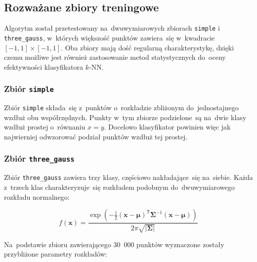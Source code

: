 \documentclass[11pt,a4paper]{article}
\begin{document}
\subsection{Rozważane zbiory treningowe}

Algorytm został przetestowany na~dwuwymiarowych zbiorach {\tt simple} i {\tt three\_gauss}, w~których większość punktów zawiera~się w~kwadracie $[-1,1] \times [-1,1]$.
Oba zbiory mają dość regularną charakterystykę, dzięki czemu możliwe jest również zastosowanie metod statystycznych do~oceny efektywności klasyfikatora $k$-NN.

\subsubsection{Zbiór {\tt simple}}

Zbiór {\tt simple} składa~się z~punktów o~rozkładzie zbliżonym do~jednostajnego wzdłuż obu współrzędnych. %
Punkty w~tym zbiorze podzielone~są na~dwie klasy wzdłuż prostej o~równaniu $x=y$.
Docelowo klasyfikator powinien więc jak najwierniej odwzorować podział punktów wzdłuż tej prostej.

\subsubsection{Zbiór {\tt three\_gauss}}

Zbiór {\tt three\_gauss} zawiera trzy klasy, częściowo nakładające~się na~siebie.
Każda z~trzech klas charakteryzuje~się rozkładem podobnym do~dwuwymiarowego rozkładu normalnego:

$$ f(\mathbf{x}) = \frac{\exp \left( -\frac{1}{2} (\mathbf{x} - \boldsymbol\mu)^\mathsf{T} \boldsymbol\Sigma^{-1} (\mathbf{x} - \boldsymbol\mu) \right)}{2\pi \sqrt{|\boldsymbol\Sigma|}} $$

Na~podstawie zbioru zawierającego 30~000 punktów wyznaczone zostały przybliżone parametry rozkładów:
\end{document}
